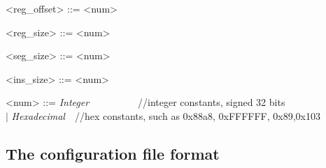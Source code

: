 \documentclass{article}
\begin{document}
\begin{grammar}
{<reg\_offset>     ::=   <num>

<reg\_size>     ::=   <num>

<seg\_size>     ::=   <num>

<ins\_size>     ::=   <num>

<num>     ::=   \emph{Integer}~~~~~~~~~~//integer constants, signed 32 bits \\
     \hspace*{0.65cm} $\mid$  \emph{Hexadecimal}~~//hex constants, such as 0x88a8, 0xFFFFFF, 0x89,0x103 \\

\par}

\end{grammar}


\subsection{The configuration file format}
\end{document}
